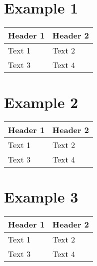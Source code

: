 \section{Example 1}\label{example-1}

\begin{longtable}[c]{@{}ll@{}}
\toprule
Header 1 & Header 2\tabularnewline
\midrule
\endhead
Text 1 & Text 2\tabularnewline
Text 3 & Text 4\tabularnewline
\bottomrule
\end{longtable}

\section{Example 2}\label{example-2}

\begin{longtable}[c]{@{}ll@{}}
\toprule
Header 1 & Header 2\tabularnewline
\midrule
\endhead
Text 1 & Text 2\tabularnewline
Text 3 & Text 4\tabularnewline
\bottomrule
\end{longtable}

\section{Example 3}\label{example-3}

\begin{longtable}[c]{@{}ll@{}}
\toprule
Header 1 & Header 2\tabularnewline
\midrule
\endhead
Text 1 & Text 2\tabularnewline
Text 3 & Text 4\tabularnewline
\bottomrule
\end{longtable}
